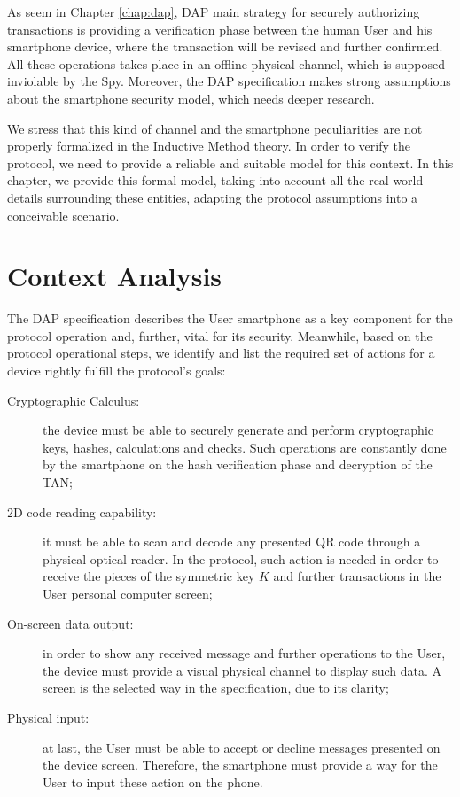 \label{chap:formal-phones}

As seem in Chapter \ref{chap:dap}, DAP main strategy for securely authorizing transactions is providing a verification phase between the human User and his smartphone device, where the transaction will be revised and further confirmed. All these operations takes place in an offline physical channel, which is supposed inviolable by the Spy. Moreover, the DAP specification makes strong assumptions about the smartphone security model, which needs deeper research.

We stress that this kind of channel and the smartphone peculiarities are not properly formalized in the Inductive Method theory. In order to verify the protocol, we need to provide a reliable and suitable model for this context. In this chapter, we provide this formal model, taking into account all the real world details surrounding these entities, adapting the protocol assumptions into a conceivable scenario.


\section{Context Analysis}
The DAP specification describes the User smartphone as a key component for the protocol operation and, further, vital for its security. Meanwhile, based on the protocol operational steps, we identify and list the required set of actions for a device rightly fulfill the protocol's goals:

\begin{description}
  \item[Cryptographic Calculus:] the device must be able to securely generate and perform cryptographic keys, hashes, calculations and checks. Such operations are constantly done by the smartphone on the hash verification phase and decryption of the TAN;

  \item[2D code reading capability:] it must be able to scan and decode any presented QR code through a physical optical reader. In the protocol, such action is needed in order to receive the pieces of the symmetric key $K$ and further transactions in the User personal computer screen;

  \item[On-screen data output:] in order to show any received message and further operations to the User, the device must provide a visual physical channel to display such data. A screen is the selected way in the specification, due to its clarity;

  \item[Physical input:] at last, the User must be able to accept or decline messages presented on the device screen. Therefore, the smartphone must provide a way for the User to input these action on the phone.
\end{description}

